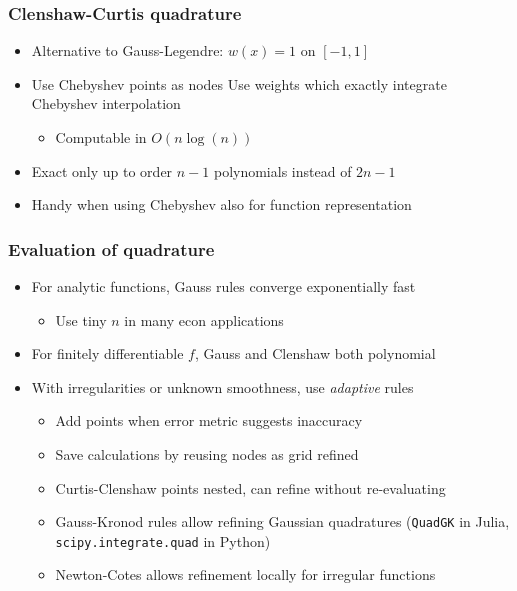 \documentclass[bigger,handout]{beamer}
\begin{document}
\begin{frame}%

\frametitle{Clenshaw-Curtis quadrature}

\begin{itemize}
\item Alternative to Gauss-Legendre: $w(x)=1$ on $[-1,1]$ 
\item Use Chebyshev points as nodes \newline 
Use weights which exactly integrate Chebyshev interpolation
\begin{itemize}
\item Computable in $O(n\log (n))$
\end{itemize}
\item Exact only up to order $n-1$ polynomials instead of $2n-1$
\item Handy when using Chebyshev also for function representation
\end{itemize}


\end{frame}%

\begin{frame}%

\frametitle{Evaluation of quadrature}

\begin{itemize}
\item For analytic functions, Gauss rules converge exponentially fast
\begin{itemize}
\item Use tiny $n$ in many econ applications
\end{itemize}
\item For finitely differentiable $f$, Gauss and Clenshaw both polynomial
\item With irregularities or unknown smoothness, use \emph{adaptive} rules
\begin{itemize}
\item Add points when error metric suggests inaccuracy
\item Save calculations by reusing nodes as grid refined
\item Curtis-Clenshaw points nested, can refine without re-evaluating
\item Gauss-Kronod rules allow refining Gaussian quadratures (\texttt{QuadGK} in Julia, \texttt{scipy.integrate.quad} in Python)
\item Newton-Cotes allows refinement locally for irregular functions
\end{itemize}

\end{itemize}


\end{frame}%
\end{document}
